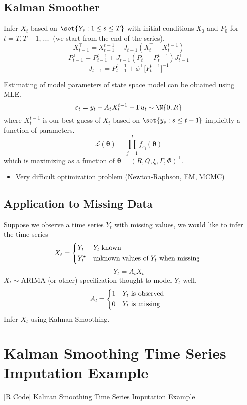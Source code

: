 \subsection*{Kalman Smoother}
Infer $ X_t $ based on $ \set{Y_s:1\le s\le T} $ with initial conditions
$ X_0 $ and $ P_0 $ for $ t=T,T-1,\ldots, $ (we start from the end of the series).
\[ X_{t-1}^\top = X_{t-1}^{t-1}+J_{t-1}(X_t^\top - X_t^{t-1}) \]
\[ P_{t-1}^\top = P_{t-1}^{t-1}+J_{t-1}(P_t^\top - P_t^{t-1})J_{t-1}^\top \]
\[ J_{t-1}=P_{t-1}^{t-1}+\phi^\top\bigl[P_t^{t-1}\bigr]^{-1} \]
\begin{Remark}{}{}
    Estimating of model parameters of state space model can be obtained using MLE\@.
    \[ \varepsilon_t=y_t-A_t X_t^{t-1}-\Gamma u_t \sim \N{0,R} \]
    where $ X_t^{t-1} $ is our best guess of $ X_t $ based on $ \set{y_s:s\le t-1} $
    implicitly a function of parameters.
    \[ \mathcal{L}(\symbf{\theta})=\prod_{j=1}^T f_{\varepsilon_j}(\symbf{\theta}) \]
    which is maximizing as a function of $ \symbf{\theta}=(R,Q,\xi,\Gamma,\Phi)^\top $.
    \begin{itemize}
        \item Very difficult optimization problem (Newton-Raphson, EM, MCMC)
    \end{itemize}
\end{Remark}
\subsection*{Application to Missing Data}
Suppose we observe a time series $ Y_t $ with missing values, we would like to
infer the time series
\[ X_t=\begin{cases*}
        Y_t       & $ Y_t $ known                          \\
        Y_t^\star & unknown values of $ Y_t $ when missing
    \end{cases*} \]
\[ Y_t=A_t X_t \]
$ X_t \sim \text{ARIMA} $ (or other) specification thought to model $ Y_t $ well.
\[ A_t=\begin{cases*}
        1 & $ Y_t $ is observed \\
        0 & $ Y_t $ is missing
    \end{cases*} \]
Infer $ X_t $ using Kalman Smoothing.
\section{Kalman Smoothing Time Series Imputation Example}
\href{https://github.com/Hextical/university-notes/blob/master/year-3/semester-2/STAT 443/code/12.5 - Kalman Smoothing Time Series Imputation Example.R}{[R Code] Kalman Smoothing Time Series Imputation Example}
